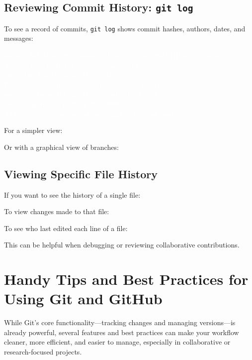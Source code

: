\subsection*{Reviewing Commit History: \texttt{git log}}
\noindent To see a record of commits, \texttt{git log} shows commit hashes, authors, dates, and messages:
\begin{terminal}

\textcolor{white}{commit 3a81b2f3018d2cbbd540e8d1e0db457ca170c9c4 (HEAD -> main)\\
Author: Paul Kieffaber <paul@example.edu>\\
Date:   Tue Jun 18 14:03:00 2025 -0400\\
    Refactored bootstrapping code into separate function\\
commit c71ae6c8481732ccf7c993dcfcdf5e1a24c5fd9c\\
Date:   Mon Jun 17 16:20:34 2025 -0400\\
    Added initial analysis script for Cognitive Control Study
   }
\end{terminal}
\noindent For a simpler view:
\begin{terminal}
\end{terminal}
\noindent Or with a graphical view of branches:
\begin{terminal}
\end{terminal}

\subsection*{Viewing Specific File History}
\noindent If you want to see the history of a single file:
\begin{terminal}
\end{terminal}
\noindent To view changes made to that file:
\begin{terminal}
\end{terminal}
\noindent To see who last edited each line of a file:
\begin{terminal}
\end{terminal}
\noindent This can be helpful when debugging or reviewing collaborative contributions.

\section{Handy Tips and Best Practices for Using Git and GitHub}
While Git’s core functionality—tracking changes and managing versions—is already powerful, several features and best practices can make your workflow cleaner, more efficient, and easier to manage, especially in collaborative or research-focused projects.

